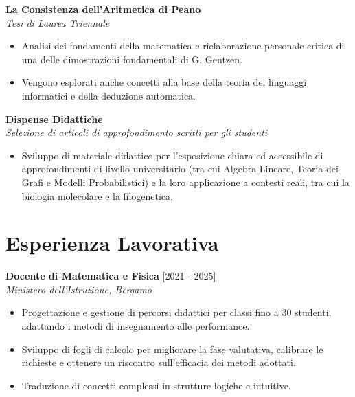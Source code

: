 \documentclass[10pt, a4paper]{article}
\begin{document}
\begin{minipage}[t]{0.62\textwidth}
		\textbf{La Consistenza dell'Aritmetica di Peano} \\
		\textit{Tesi di Laurea Triennale}
		\begin{itemize}
			\item Analisi dei fondamenti della matematica e rielaborazione personale critica di una delle dimostrazioni fondamentali di G. Gentzen. 
			\item Vengono esplorati anche concetti alla base della teoria dei linguaggi informatici e della deduzione automatica.
		\end{itemize}
		\vspace{2mm}
		
		\textbf{Dispense Didattiche} \\
		\textit{Selezione di articoli di approfondimento scritti per gli studenti}
		\begin{itemize}
			\item Sviluppo di materiale didattico per l'esposizione chiara ed accessibile di approfondimenti di livello universitario (tra cui Algebra Lineare, Teoria dei Grafi e Modelli Probabilistici) e la loro applicazione a contesti reali, tra cui la biologia molecolare e la filogenetica.
		\end{itemize}
		
		
			
		\section*{Esperienza Lavorativa}
		
			\textbf{Docente di Matematica e Fisica} \hfill [2021 - 2025] \\
			\textit{Ministero dell'Istruzione, Bergamo}
			\begin{itemize}
				\item Progettazione e gestione di percorsi didattici per classi fino a 30 studenti, adattando i metodi di insegnamento alle performance.
				\item Sviluppo di fogli di calcolo per migliorare la fase valutativa, calibrare le richieste e ottenere un riscontro sull'efficacia dei metodi adottati.
				\item Traduzione di concetti complessi in strutture logiche e intuitive.
			\end{itemize}
		
	\end{minipage}
\end{document}
